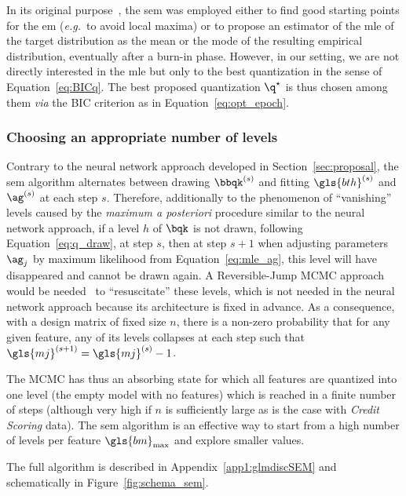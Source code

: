 In its original purpose~\cite{celeux_sem}, the \gls{sem} was employed either to find good starting points for the \gls{em} (\textit{e.g.}\ to avoid local maxima) or to propose an estimator of the \gls{mle} of the target distribution as the mean or the mode of the resulting empirical distribution, eventually after a burn-in phase. However, in our setting, we are not directly interested in the \gls{mle} but only to the best quantization in the sense of Equation~\eqref{eq:BICq}. The best proposed quantization $\q^\star$ is thus chosen among them \textit{via} the BIC criterion as in Equation~\eqref{eq:opt_epoch}.

\subsubsection{Choosing an appropriate number of levels} \label{par:choosing_sem}

Contrary to the neural network approach developed in Section~\ref{sec:proposal}, the \gls{sem} algorithm alternates between drawing $\bbqk^{(s)}$ and fitting ${\gls{bth}}^{(s)}$ and ${\ag}^{(s)}$  at each step $s$. Therefore, additionally to the phenomenon of ``vanishing'' levels caused by the \textit{maximum a posteriori} procedure similar to the neural network approach, if a level $h$ of $\bqk$ is not drawn, following Equation~\eqref{eq:q_draw}, at step $s$, then at step $s+1$ when adjusting parameters $\ag_j$ by maximum likelihood from Equation~\eqref{eq:mle_ag}, this level will have disappeared and cannot be drawn again. A Reversible-Jump MCMC approach would be needed~\cite{green1995reversible} to ``resuscitate'' these levels, which is not needed in the neural network approach because its architecture is fixed in advance. As a consequence, with a design matrix of fixed size $n$, there is a non-zero probability that for any given feature, any of its levels collapses at each step such that $\gls{mj}^{(s+1)} = \gls{mj}^{(s)} - 1$.

The MCMC has thus an absorbing state for which all features are quantized into one level (the empty model with no features) which is reached in a finite number of steps (although very high if $n$ is sufficiently large as is the case with \textit{Credit Scoring} data). The \gls{sem} algorithm is an effective way to start from a high number of levels per feature $\gls{bm}_{\max}$ and explore smaller values.

The full algorithm is described in Appendix~\ref{app1:glmdiscSEM} and schematically in Figure~\ref{fig:schema_sem}.

